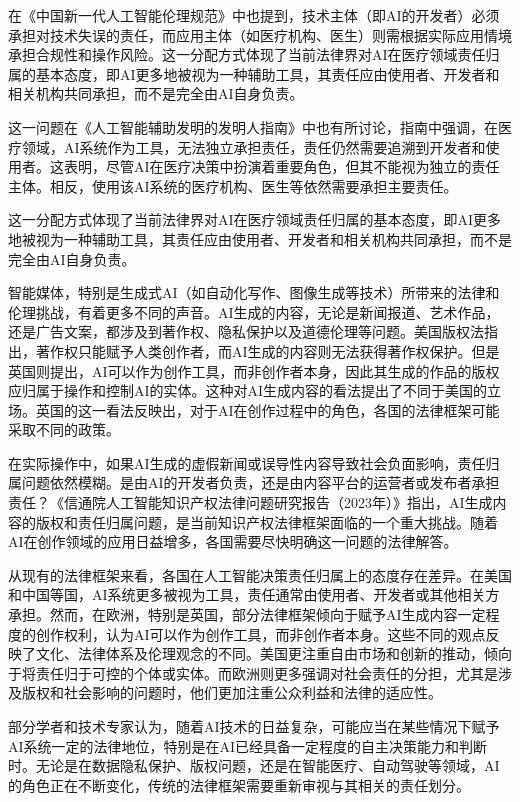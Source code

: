 在《中国新一代人工智能伦理规范》中也提到，技术主体（即AI的开发者）必须承担对技术失误的责任，而应用主体（如医疗机构、医生）则需根据实际应用情境承担合规性和操作风险。这一分配方式体现了当前法律界对AI在医疗领域责任归属的基本态度，即AI更多地被视为一种辅助工具，其责任应由使用者、开发者和相关机构共同承担，而不是完全由AI自身负责。

这一问题在《人工智能辅助发明的发明人指南》中也有所讨论，指南中强调，在医疗领域，AI系统作为工具，无法独立承担责任，责任仍然需要追溯到开发者和使用者。这表明，尽管AI在医疗决策中扮演着重要角色，但其不能视为独立的责任主体。相反，使用该AI系统的医疗机构、医生等依然需要承担主要责任。

这一分配方式体现了当前法律界对AI在医疗领域责任归属的基本态度，即AI更多地被视为一种辅助工具，其责任应由使用者、开发者和相关机构共同承担，而不是完全由AI自身负责。

智能媒体，特别是生成式AI（如自动化写作、图像生成等技术）所带来的法律和伦理挑战，有着更多不同的声音。AI生成的内容，无论是新闻报道、艺术作品，还是广告文案，都涉及到著作权、隐私保护以及道德伦理等问题。美国版权法指出，著作权只能赋予人类创作者，而AI生成的内容则无法获得著作权保护。但是英国则提出，AI可以作为创作工具，而非创作者本身，因此其生成的作品的版权应归属于操作和控制AI的实体。这种对AI生成内容的看法提出了不同于美国的立场。英国的这一看法反映出，对于AI在创作过程中的角色，各国的法律框架可能采取不同的政策。

在实际操作中，如果AI生成的虚假新闻或误导性内容导致社会负面影响，责任归属问题依然模糊。是由AI的开发者负责，还是由内容平台的运营者或发布者承担责任？《信通院人工智能知识产权法律问题研究报告（2023年）》指出，AI生成内容的版权和责任归属问题，是当前知识产权法律框架面临的一个重大挑战。随着AI在创作领域的应用日益增多，各国需要尽快明确这一问题的法律解答。

从现有的法律框架来看，各国在人工智能决策责任归属上的态度存在差异。在美国和中国等国，AI系统更多被视为工具，责任通常由使用者、开发者或其他相关方承担。然而，在欧洲，特别是英国，部分法律框架倾向于赋予AI生成内容一定程度的创作权利，认为AI可以作为创作工具，而非创作者本身。这些不同的观点反映了文化、法律体系及伦理观念的不同。美国更注重自由市场和创新的推动，倾向于将责任归于可控的个体或实体。而欧洲则更多强调对社会责任的分担，尤其是涉及版权和社会影响的问题时，他们更加注重公众利益和法律的适应性。

部分学者和技术专家认为，随着AI技术的日益复杂，可能应当在某些情况下赋予AI系统一定的法律地位，特别是在AI已经具备一定程度的自主决策能力和判断时。无论是在数据隐私保护、版权问题，还是在智能医疗、自动驾驶等领域，AI的角色正在不断变化，传统的法律框架需要重新审视与其相关的责任划分。

